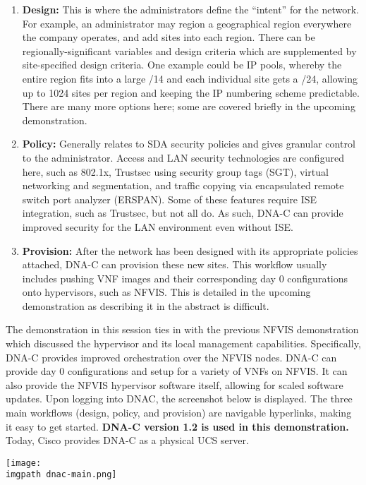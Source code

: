 \begin{enumerate}
  \item \textbf{Design:} This is where the administrators define the ``intent'' for the
  network. For example, an administrator may region a geographical region
  everywhere the company operates, and add sites into each region. There can be
  regionally-significant variables and design criteria which are supplemented by
  site-specified design criteria. One example could be IP pools, whereby the
  entire region fits into a large /14 and each individual site gets a /24,
  allowing up to 1024 sites per region and keeping the IP numbering scheme
  predictable. There are many more options here; some are covered briefly in the
  upcoming demonstration.
  \item \textbf{Policy:} Generally relates to SDA security policies and gives granular
  control to the administrator. Access and LAN security technologies are
  configured here, such as 802.1x, Trustsec using security group tags (SGT),
  virtual networking and segmentation, and traffic copying via encapsulated
  remote switch port analyzer (ERSPAN). Some of these features require ISE
  integration, such as Trustsec, but not all do. As such, DNA-C can provide
  improved security for the LAN environment even without ISE.
  \item \textbf{Provision:} After the network has been designed with its appropriate
  policies attached, DNA-C can provision these new sites. This workflow usually
  includes pushing VNF images and their corresponding day 0 configurations onto
  hypervisors, such as NFVIS. This is detailed in the upcoming demonstration as
  describing it in the abstract is difficult.
\end{enumerate}

The demonstration in this session ties in with the previous NFVIS
demonstration which discussed the hypervisor and its local management
capabilities. Specifically, DNA-C provides improved orchestration over the
NFVIS nodes. DNA-C can provide day 0 configurations and setup for a variety of
VNFs on NFVIS. It can also provide the NFVIS hypervisor software itself,
allowing for scaled software updates. Upon logging into DNAC, the screenshot
below is displayed. The three main workflows (design, policy, and provision)
are navigable hyperlinks, making it easy to get started. \textbf{DNA-C version 1.2
is used in this demonstration.} Today, Cisco provides DNA-C as a physical UCS
server.

    \begin{minipage}[t]{\linewidth}
	  \centering
      \texttt{[image: \\imgpath dnac-main.png]}
    \end{minipage}

